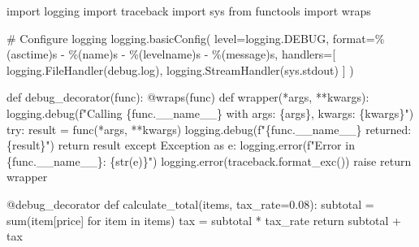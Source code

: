 \documentclass[
  letterpaper,
  DIV=11,
  numbers=noendperiod,
  oneside]{scrreprt}
\newenvironment{Shaded}{}{}
\newcommand{\AttributeTok}[1]{\textcolor[rgb]{0.84,0.23,0.29}{#1}}
\newcommand{\BuiltInTok}[1]{\textcolor[rgb]{0.84,0.23,0.29}{#1}}
\newcommand{\CommentTok}[1]{\textcolor[rgb]{0.42,0.45,0.49}{#1}}
\newcommand{\ControlFlowTok}[1]{\textcolor[rgb]{0.84,0.23,0.29}{#1}}
\newcommand{\FloatTok}[1]{\textcolor[rgb]{0.00,0.36,0.77}{#1}}
\newcommand{\ImportTok}[1]{\textcolor[rgb]{0.01,0.18,0.38}{#1}}
\newcommand{\KeywordTok}[1]{\textcolor[rgb]{0.84,0.23,0.29}{#1}}
\newcommand{\NormalTok}[1]{\textcolor[rgb]{0.14,0.16,0.18}{#1}}
\newcommand{\OperatorTok}[1]{\textcolor[rgb]{0.14,0.16,0.18}{#1}}
\newcommand{\PreprocessorTok}[1]{\textcolor[rgb]{0.84,0.23,0.29}{#1}}
\newcommand{\SpecialCharTok}[1]{\textcolor[rgb]{0.00,0.36,0.77}{#1}}
\newcommand{\SpecialStringTok}[1]{\textcolor[rgb]{0.01,0.18,0.38}{#1}}
\newcommand{\StringTok}[1]{\textcolor[rgb]{0.01,0.18,0.38}{#1}}
\newcommand{\VariableTok}[1]{\textcolor[rgb]{0.89,0.38,0.04}{#1}}
\begin{document}
\begin{Shaded}
\begin{Highlighting}[]
\ImportTok{import}\NormalTok{ logging}
\ImportTok{import}\NormalTok{ traceback}
\ImportTok{import}\NormalTok{ sys}
\ImportTok{from}\NormalTok{ functools }\ImportTok{import}\NormalTok{ wraps}

\CommentTok{\# Configure logging}
\NormalTok{logging.basicConfig(}
\NormalTok{    level}\OperatorTok{=}\NormalTok{logging.DEBUG,}
    \BuiltInTok{format}\OperatorTok{=}\StringTok{\textquotesingle{}}\SpecialCharTok{\%(asctime)s}\StringTok{ {-} }\SpecialCharTok{\%(name)s}\StringTok{ {-} }\SpecialCharTok{\%(levelname)s}\StringTok{ {-} }\SpecialCharTok{\%(message)s}\StringTok{\textquotesingle{}}\NormalTok{,}
\NormalTok{    handlers}\OperatorTok{=}\NormalTok{[}
\NormalTok{        logging.FileHandler(}\StringTok{\textquotesingle{}debug.log\textquotesingle{}}\NormalTok{),}
\NormalTok{        logging.StreamHandler(sys.stdout)}
\NormalTok{    ]}
\NormalTok{)}

\KeywordTok{def}\NormalTok{ debug\_decorator(func):}
    \AttributeTok{@wraps}\NormalTok{(func)}
    \KeywordTok{def}\NormalTok{ wrapper(}\OperatorTok{*}\NormalTok{args, }\OperatorTok{**}\NormalTok{kwargs):}
\NormalTok{        logging.debug(}\SpecialStringTok{f"Calling }\SpecialCharTok{\{}\NormalTok{func}\SpecialCharTok{.}\VariableTok{\_\_name\_\_}\SpecialCharTok{\}}\SpecialStringTok{ with args: }\SpecialCharTok{\{}\NormalTok{args}\SpecialCharTok{\}}\SpecialStringTok{, kwargs: }\SpecialCharTok{\{}\NormalTok{kwargs}\SpecialCharTok{\}}\SpecialStringTok{"}\NormalTok{)}
        \ControlFlowTok{try}\NormalTok{:}
\NormalTok{            result }\OperatorTok{=}\NormalTok{ func(}\OperatorTok{*}\NormalTok{args, }\OperatorTok{**}\NormalTok{kwargs)}
\NormalTok{            logging.debug(}\SpecialStringTok{f"}\SpecialCharTok{\{}\NormalTok{func}\SpecialCharTok{.}\VariableTok{\_\_name\_\_}\SpecialCharTok{\}}\SpecialStringTok{ returned: }\SpecialCharTok{\{}\NormalTok{result}\SpecialCharTok{\}}\SpecialStringTok{"}\NormalTok{)}
            \ControlFlowTok{return}\NormalTok{ result}
        \ControlFlowTok{except} \PreprocessorTok{Exception} \ImportTok{as}\NormalTok{ e:}
\NormalTok{            logging.error(}\SpecialStringTok{f"Error in }\SpecialCharTok{\{}\NormalTok{func}\SpecialCharTok{.}\VariableTok{\_\_name\_\_}\SpecialCharTok{\}}\SpecialStringTok{: }\SpecialCharTok{\{}\BuiltInTok{str}\NormalTok{(e)}\SpecialCharTok{\}}\SpecialStringTok{"}\NormalTok{)}
\NormalTok{            logging.error(traceback.format\_exc())}
            \ControlFlowTok{raise}
    \ControlFlowTok{return}\NormalTok{ wrapper}

\AttributeTok{@debug\_decorator}
\KeywordTok{def}\NormalTok{ calculate\_total(items, tax\_rate}\OperatorTok{=}\FloatTok{0.08}\NormalTok{):}
\NormalTok{    subtotal }\OperatorTok{=} \BuiltInTok{sum}\NormalTok{(item[}\StringTok{\textquotesingle{}price\textquotesingle{}}\NormalTok{] }\ControlFlowTok{for}\NormalTok{ item }\KeywordTok{in}\NormalTok{ items)}
\NormalTok{    tax }\OperatorTok{=}\NormalTok{ subtotal }\OperatorTok{*}\NormalTok{ tax\_rate}
    \ControlFlowTok{return}\NormalTok{ subtotal }\OperatorTok{+}\NormalTok{ tax}
\end{Highlighting}
\end{Shaded}
\end{document}
